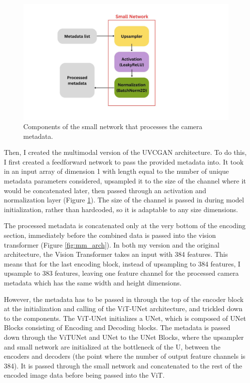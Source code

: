 \documentclass[10pt,twocolumn]{article}
\begin{document}
\begin{figure}[h]
	\centering
        \includegraphics[scale=0.2]{images/smallnetwork.jpg}
	\caption{Components of the small network that processes the camera metadata.}
	\label{fig:smallnetwork}
\end{figure}

Then, I created the multimodal version of the UVCGAN architecture. 
To do this, I first created a feedforward network to pass the provided metadata into. It took in an input array of dimension 1 with length equal to the number of unique metadata parameters considered, upsampled it to the size of the channel where it would be concatenated later, then passed through an activation and normalization layer (Figure \ref{fig:smallnetwork}). The size of the channel is passed in during model initialization, rather than hardcoded, so it is adaptable to any size dimensions.

The processed metadata is concatenated only at the very bottom of the encoding section, immediately before the combined data is passed into the vision transformer (Figure \ref{fig:mm_arch}). In both my version and the original architecture, the Vision Transformer takes an input with 384 features. This means that for the last encoding block, instead of upsampling to 384 features, I upsample to 383 features, leaving one feature channel for the processed camera metadata which has the same width and height dimensions.

However, the metadata has to be passed in through the top of the encoder block at the initialization and calling of the ViT-UNet architecture, and trickled down to the components. The ViT-UNet initializes a UNet, which is composed of UNet Blocks consisting of Encoding and Decoding blocks. The metadata is passed down through the ViTUNet and UNet to the UNet Blocks, where the upsampler and small network are initialized at the bottleneck of the U, between the encoders and decoders (the point where the number of output feature channels is 384). It is passed through the small network and concatenated to the rest of the encoded image data before being passed into the ViT.
\end{document}
